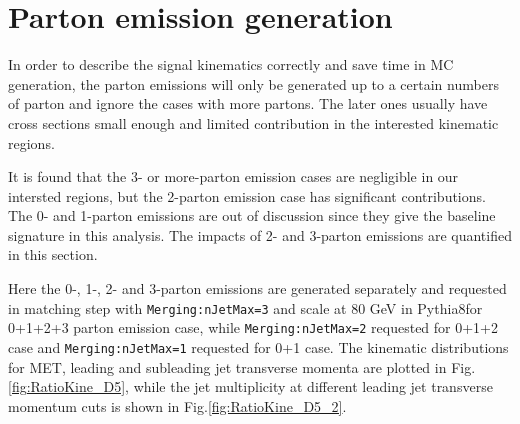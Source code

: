 \section{Parton emission generation}
\label{sec:monojet_parton_emission}
In order to describe the signal kinematics correctly and save time in MC generation, the parton emissions will only be generated up to a certain numbers of parton and ignore the cases with more partons. The later ones usually have cross sections small enough and limited contribution in the interested kinematic regions.

It is found that the 3- or more-parton emission cases are negligible in our intersted regions, but the 2-parton emission case has significant contributions. The 0- and 1-parton emissions are out of discussion since they give the baseline signature in this analysis. The impacts of 2- and 3-parton emissions are quantified in this section.

Here the 0-, 1-, 2- and 3-parton emissions are generated separately and requested in matching step with \texttt{Merging:nJetMax=3} and scale at 80 GeV in Pythia8for 0+1+2+3 parton emission case, while \texttt{Merging:nJetMax=2} requested for 0+1+2 case and \texttt{Merging:nJetMax=1} requested for 0+1 case. The kinematic distributions for MET, leading and subleading jet transverse momenta are plotted in Fig.\ref{fig:RatioKine_D5}, while the jet multiplicity at different leading jet transverse momentum cuts is shown in Fig.\ref{fig:RatioKine_D5_2}.

